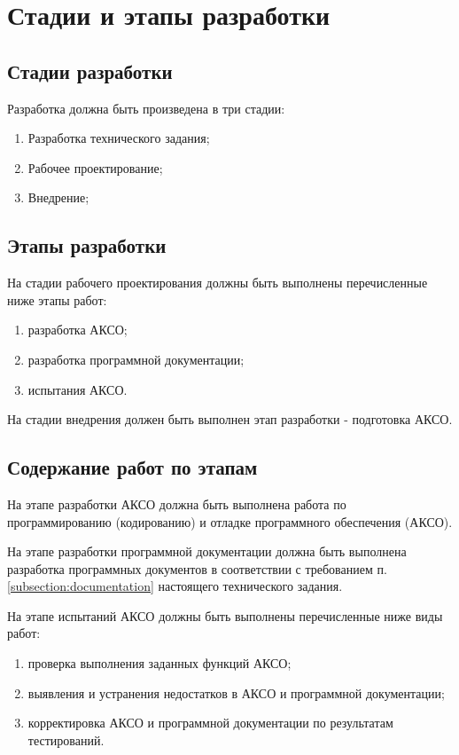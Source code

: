 	\section{Стадии и этапы разработки}
	
	\subsection{Стадии разработки}
	
	Разработка должна быть произведена в три стадии\cite{iso-12207}:
	\begin{enumerate}
		\item Разработка технического задания;
		\item Рабочее проектирование;
		\item Внедрение;
	\end{enumerate}
	
	\subsection{Этапы разработки}
	На стадии рабочего проектирования должны быть выполнены перечисленные ниже этапы работ:
	\begin{enumerate}
		\item разработка АКСО; 
		\item разработка программной документации; 
		\item испытания АКСО.
	\end{enumerate}
	
	На стадии внедрения должен быть выполнен этап разработки - подготовка АКСО.
	
	\subsection{Содержание работ по этапам}
	
	На этапе разработки АКСО должна быть выполнена работа по программированию (кодированию) и отладке программного обеспечения (АКСО).
	
	На этапе разработки программной документации должна быть выполнена разработка программных документов в соответствии с требованием п. \ref{subsection:documentation} настоящего технического задания.
	
	На этапе испытаний АКСО должны быть выполнены перечисленные ниже виды работ:
	
	\begin{enumerate}
		\item проверка выполнения заданных функций АКСО;
		\item выявления и устранения недостатков в АКСО и программной документации; 
		\item корректировка АКСО и программной документации по результатам тестирований.
	\end{enumerate}
	
